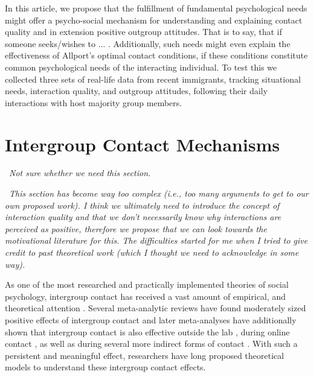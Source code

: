 \documentclass[man, 12pt, a4paper]{apa7}
\theoremstyle{break}
\theoremstyle{plain}
\begin{document}
In this article, we propose that the fulfillment of fundamental psychological needs might offer a psycho-social mechanism for understanding and explaining contact quality and in extension positive outgroup attitudes. That is to say, that if someone seeks/wishes to ... . 
Additionally, such needs might even explain the effectiveness of Allport's optimal contact conditions, if these conditions constitute common psychological needs of the interacting individual. To test this we collected three sets of real-life data from recent immigrants, tracking situational needs, interaction quality, and outgroup attitudes, following their daily interactions with host majority group members. 

\section{Intergroup Contact Mechanisms}
\faQuestionCircle\ \textit{Not sure whether we need this section.}

\faExclamationCircle\ \textit{This section has become way too complex (i.e., too many arguments to get to our own proposed work). I think we ultimately need to introduce the concept of interaction quality and that we don't necessarily know why interactions are perceived as positive, therefore we propose that we can look towards the motivational literature for this. The difficulties started for me when I tried to give credit to past theoretical work (which I thought we need to acknowledge in some way).}

As one of the most researched and practically implemented theories of social psychology, intergroup contact has received a vast amount of empirical, and theoretical attention \citep[][]{Dovidio2017}. Several meta-analytic reviews have found moderately sized positive effects of intergroup contact \citep[][]{Tropp2005, Pettigrew2006, Davies2011} and later meta-analyses have additionally shown that intergroup contact is also effective outside the lab \citep[][]{Beelmann2014, Lemmer2015}, during online contact \citep[][]{White2020}, as well as during several more indirect forms of contact \citep[][]{Miles2014, Zhou2019, Harwood2021}. With such a persistent and meaningful effect, researchers have long proposed theoretical models to understand these intergroup contact effects. 
\end{document}
